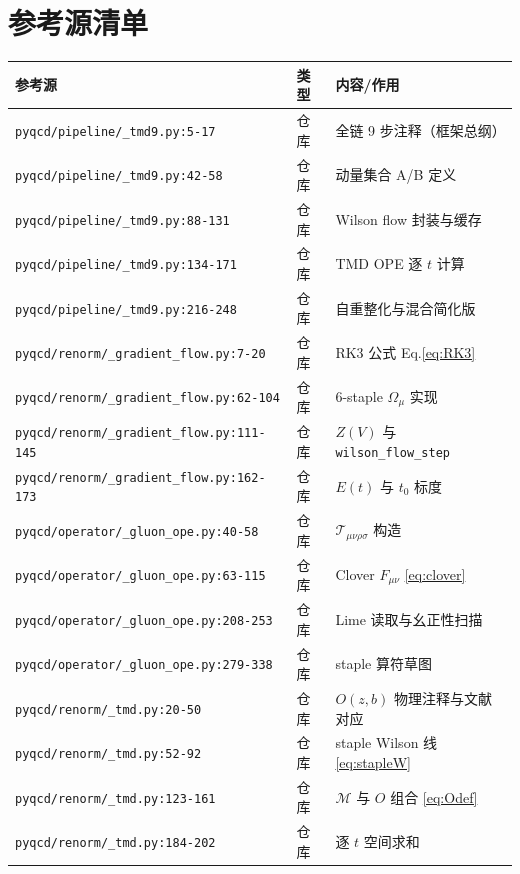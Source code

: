 \documentclass[UTF8]{ctexart}
\begin{document}
\section{参考源清单}
\label{sec:reflist}
\small
\begin{xltabular}{\textwidth}{llX}
\toprule
\textcolor{evidence}{参考源} & 类型 & 内容/作用 \\
\midrule
\endhead
\texttt{\nolinkurl{pyqcd/pipeline/\_tmd9.py:5-17}} & 仓库 & 全链 9 步注释（框架总纲）\\
\texttt{\nolinkurl{pyqcd/pipeline/\_tmd9.py:42-58}} & 仓库 & 动量集合 A/B 定义 \\
\texttt{\nolinkurl{pyqcd/pipeline/\_tmd9.py:88-131}} & 仓库 & Wilson flow 封装与缓存 \\
\texttt{\nolinkurl{pyqcd/pipeline/\_tmd9.py:134-171}} & 仓库 & TMD OPE 逐 $t$ 计算 \\
\texttt{\nolinkurl{pyqcd/pipeline/\_tmd9.py:216-248}} & 仓库 & 自重整化与混合简化版 \\
\texttt{\nolinkurl{pyqcd/renorm/\_gradient\_flow.py:7-20}} & 仓库 & RK3 公式 Eq.\eqref{eq:RK3} \\
\texttt{\nolinkurl{pyqcd/renorm/\_gradient\_flow.py:62-104}} & 仓库 & 6-staple $\Omega_\mu$ 实现 \\
\texttt{\nolinkurl{pyqcd/renorm/\_gradient\_flow.py:111-145}} & 仓库 & $Z(V)$ 与 \texttt{\nolinkurl{wilson\_flow\_step}} \\
\texttt{\nolinkurl{pyqcd/renorm/\_gradient\_flow.py:162-173}} & 仓库 & $E(t)$ 与 $t_0$ 标度 \\
\texttt{\nolinkurl{pyqcd/operator/\_gluon\_ope.py:40-58}} & 仓库 & $\mathcal{T}_{\mu\nu\rho\sigma}$ 构造 \\
\texttt{\nolinkurl{pyqcd/operator/\_gluon\_ope.py:63-115}} & 仓库 & Clover $F_{\mu\nu}$ \eqref{eq:clover} \\
\texttt{\nolinkurl{pyqcd/operator/\_gluon\_ope.py:208-253}} & 仓库 & Lime 读取与幺正性扫描 \\
\texttt{\nolinkurl{pyqcd/operator/\_gluon\_ope.py:279-338}} & 仓库 & staple 算符草图 \\
\texttt{\nolinkurl{pyqcd/renorm/\_tmd.py:20-50}} & 仓库 & $O(z,b)$ 物理注释与文献对应 \\
\texttt{\nolinkurl{pyqcd/renorm/\_tmd.py:52-92}} & 仓库 & staple Wilson 线 \eqref{eq:stapleW} \\
\texttt{\nolinkurl{pyqcd/renorm/\_tmd.py:123-161}} & 仓库 & $\mathcal{M}$ 与 $O$ 组合 \eqref{eq:Odef} \\
\texttt{\nolinkurl{pyqcd/renorm/\_tmd.py:184-202}} & 仓库 & 逐 $t$ 空间求和 \\

\end{xltabular}
\end{document}
